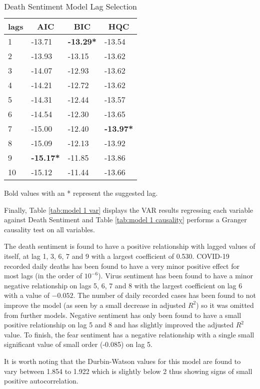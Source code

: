 \begin{table}[H]
\centering
\begin{tabular}{@{}llll@{}}
\toprule
\multicolumn{1}{c}{\textbf{lags}} & \multicolumn{1}{c}{\textbf{AIC}} & \multicolumn{1}{c}{\textbf{BIC}} & \multicolumn{1}{c}{\textbf{HQC}} \\ \midrule
1 & -13.71 & \textbf{-13.29*} & -13.54 \\
2 & -13.93 & -13.15 & -13.62 \\
3 & -14.07 & -12.93 & -13.62 \\
4 & -14.21 & -12.72 & -13.62 \\
5 & -14.31 & -12.44 & -13.57 \\
6 & -14.54 & -12.30 & -13.65 \\
7 & -15.00 & -12.40 & \textbf{-13.97*} \\
8 & -15.09 & -12.13 & -13.92 \\
9 & \textbf{-15.17*} & -11.85 & -13.86 \\
10 & -15.12 & -11.44 & -13.66 \\ \bottomrule
\end{tabular}
\caption{Death Sentiment Model Lag Selection}
\label{tab:model 1 lag}
Bold values with an * represent the suggested lag.
\end{table}

Finally, Table \ref{tab:model 1 var} displays the VAR results regressing each variable against Death Sentiment and Table \ref{tab:model 1 causality} performs a Granger causality test on all variables.

The death sentiment is found to have a positive relationship with lagged values of itself, at lag 1, 3, 6, 7 and 9 with a largest coefficient of 0.530. COVID-19 recorded daily deaths has been found to have a very minor positive effect for most lags (in the order of $10^{-6}$). Virus sentiment has been found to have a minor negative relationship on lags 5, 6, 7 and 8 with the largest coefficient on lag 6 with a value of $-0.052$. The number of daily recorded cases has been found to not improve the model (as seen by a small decrease in adjusted $R^{2}$) so it was omitted from further models. Negative sentiment has only been found to have a small positive relationship on lag 5 and 8 and has slightly improved the adjusted $R^2$ value. To finish, the fear sentiment has a negative relationship with a single small significant value of small order (-0.085) on lag 5.

It is worth noting that the Durbin-Watson values for this model are found to vary between 1.854 to 1.922 which is slightly below 2 thus showing signs of small positive autocorrelation. 

